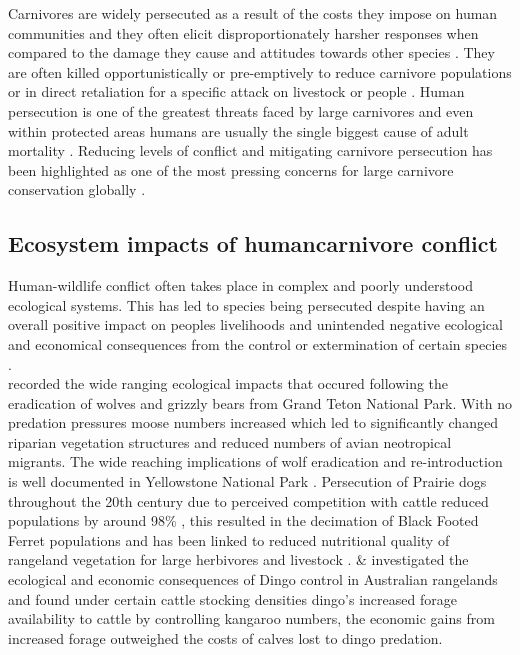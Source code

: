 Carnivores are widely persecuted as a result of the costs they impose on human communities \cite{Dickman2010b,dickman2013human,loveridge2010people,Woodroffe2005} and they often elicit disproportionately harsher responses when compared to the damage they cause and attitudes towards other species \cite{Kansky2014e,Dickman2010b}. They are often killed opportunistically or pre-emptively to reduce carnivore populations or in direct retaliation for a specific attack on livestock or people \cite{Thirgood2005}. Human persecution is one of the greatest threats faced by large carnivores and even within protected areas humans are usually the single biggest cause of adult mortality \cite{Woodroffe1998}. Reducing levels of conflict and mitigating carnivore persecution has been highlighted as one of the most pressing concerns for large carnivore conservation globally \cite{Woodroffe1998,Ray2005}.\\

\subsection{Ecosystem impacts of human\-carnivore conflict}
Human-wildlife conflict often takes place in complex and poorly understood ecological systems. This has led to species being persecuted despite having an overall positive impact on peoples livelihoods and unintended negative ecological and economical consequences from the control or extermination of certain species \cite{Dickman2010b,Prowse2014}.\\

\citet{Berger2001} recorded the wide ranging ecological impacts that occured following the eradication of wolves and grizzly bears from Grand Teton National Park. With no predation pressures moose numbers increased which led to significantly changed riparian vegetation structures and reduced numbers of avian neotropical migrants. The wide reaching implications of wolf eradication and re-introduction is well documented in Yellowstone National Park \cite{Ripple2012}. Persecution of Prairie dogs throughout the 20th century due to perceived competition with cattle reduced populations by around 98\% \cite{Kotliar1999,Whicker1988}, this resulted in the decimation of Black Footed Ferret populations \cite{Kotliar1999} and has been linked to reduced nutritional quality of rangeland vegetation for large herbivores and livestock \cite{Whicker1988}. \citet{Prowse2014} \& \citet{Allen2015a} investigated the ecological and economic consequences of Dingo control in Australian rangelands and found under certain cattle stocking densities dingo's increased forage availability to cattle by controlling kangaroo numbers, the economic gains from increased forage outweighed the costs of calves lost to dingo predation.\\


